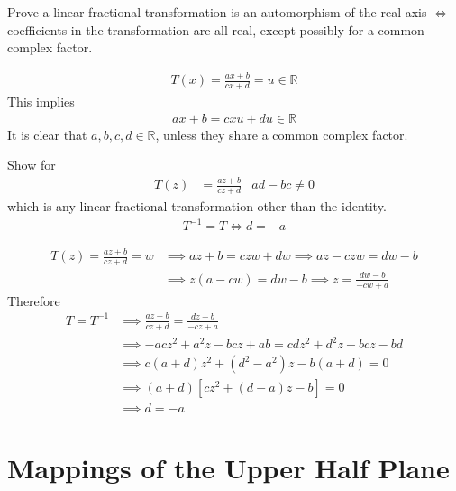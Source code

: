 \documentclass[12pt, english]{book}
\makeatletter
\renewenvironment{proof}[1][\proofname]{\par
	\pushQED{\qed}%
	\normalfont \topsep6\p@\@plus6\p@\relax
	\list{}{%
		\settowidth{\leftmargin}{\itshape\proofname:\hskip\labelsep}%
		\setlength{\labelwidth}{0pt}%
		\setlength{\itemindent}{-\leftmargin}%
		}%
	\item[\hskip\labelsep\itshape#1\@addpunct{:}]\ignorespaces
	}{\popQED\endlist\@endpefalse}
\makeatother
\begin{document}
	\begin{example}
		Prove a linear fractional transformation is an automorphism of the real axis \(\iff\) coefficients in the transformation are all real, except possibly for a common complex factor. 
		\begin{proof}
			{\color{Grey}
			\begin{align*}
				T(x) = \frac{ax + b}{cx + d} = u \in \mathbb{R}
			\end{align*}
			This implies
			\begin{align*}
				ax + b = cxu + du \in \mathbb{R}
			\end{align*}
			It is clear that \(a, b, c, d \in \mathbb{R}\), unless they share a common complex factor.
			}
		\end{proof}
	\end{example}

	\begin{example}
		Show for 
		\begin{align*}
			T(z) &= \frac{az + b}{cz + d} & ad - bc \neq 0
		\end{align*}
		which is any linear fractional transformation other than the identity. 
		\begin{align*}
			T^{-1} = T \iff d = -a
		\end{align*}
		\begin{proof}
			{\color{Grey}
			\begin{align*}
				T(z) = \frac{az + b}{cz + d} = w 
				&\implies az + b = czw + dw \implies az - czw = dw - b \\
				&\implies z(a - cw) = dw - b\implies z = \frac{dw - b}{-cw + a}
			\end{align*}
			Therefore
			\begin{align*}
				T = T^{-1}
				&\implies \frac{az + b}{cz + d} = \frac{dz - b}{-cz + a} \\
				&\implies -acz^2 + a^2 z - bcz + ab = cdz^2 + d^2 z - bcz - bd \\
				&\implies c(a+d)z^2 + (d^2 - a^2)z - b(a+d) = 0 \\
				&\implies(a + d)[cz^2 + (d-a)z - b] = 0 \\
				&\implies d = -a
			\end{align*}
			}
		\end{proof}
	\end{example}
	
	\section{Mappings of the Upper Half Plane} \label{Mappings of the Upper Half Plane Section - Complex}
	
\end{document}
